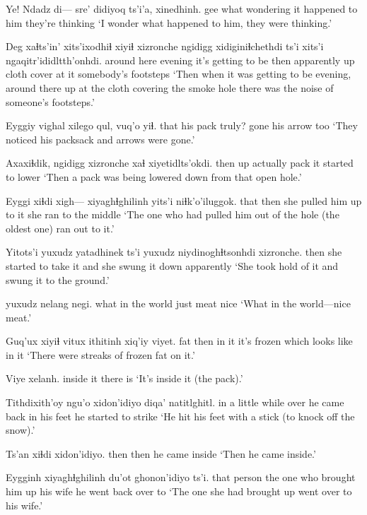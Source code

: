 \documentclass[12pt]{article}
\begin{document}
\gll Ye! Ndadz di--- sre' didiyoq ts'i'a, xinedhinh.
gee what {} wondering {it happened to him} {} {they're thinking}
\glt `I wonder what happened to him, they were thinking.'
\glend

\gll Deg xaɬts'in' xits'ixodhiɬ xiyiɬ xizronche ngidigg xidiginiɬchethdi ts'i xits'i ngaqitr'ididltth'onhdi.
{around here} evening {it's getting to be} then  apparently up  {cloth cover} {} {at it} {somebody's footsteps}
\glt `Then when it was getting to be evening, around there up at the cloth covering the smoke hole there was the noise of someone's footsteps.'
\glend

\gll Eyggiy vighal xilego qul, vuq'o yiɬ.
that   {his pack}   truly?   gone {his arrow} too
\glt `They noticed his packsack and arrows were gone.'
\glend

\gll Axaxiɬdik, ngidigg xizronche xaɬ xiyetidlts'okdi.
then      up            actually   pack {it started to lower}
\glt `Then a pack was being lowered down from that open hole.'
\glend

\gll Eyggi xiɬdi xigh--- xiyaghɬghilinh yits'i niɬk'o'iluggok.
that then {} {she pulled him up}  { to it}   {she ran to the middle}        
\glt `The one who had pulled him out of the hole (the oldest one) ran out to it.'
\glend

\gll Yitots'i yuxudz yatadhinek ts'i yuxudz niydinoghɬtsonhdi xizronche.
then {}           {she started to take it} and {} {she swung it down} apparently
\glt `She took hold of it and swung it to the ground.'
\glend

 yuxudz nelang negi.
{what in the world} just meat nice
\glt `What in the world---nice meat.'
\glend

\gll Guq'ux xiyiɬ vitux ithitinh xiq'iy viyet.
{fat} then {in it} {it's frozen} {which looks like} {in it}
\glt `There were streaks of frozen fat on it.'
\glend

\gll Viye xelanh.
{inside it} {there is}
\glt `It's inside it (the pack).'
\glend

\gll Tithdixith'oy ngu'o xidon'idiyo diqa' natitlghitl.
{in a little while}   over {he came back in} {his feet} {he started to strike}
\glt `He hit his feet with a stick (to knock off the snow).'
\glend

\gll Ts'an xiɬdi xidon'idiyo.
then then {he came inside}
\glt `Then he came inside.'
\glend

\gll Eygginh xiyaghɬghilinh du'ot ghonon'idiyo ts'i.
{that person} {the one who brought him up} {his wife} {he went back over to}
\glt `The one she had brought up went over to his wife.'
\glend
\end{document}
